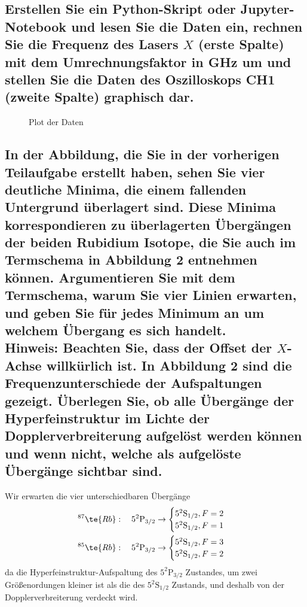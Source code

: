 \documentclass[ex,minted]{exercise_4.1}
\begin{document}
\subsection{Erstellen Sie ein Python-Skript oder Jupyter-Notebook und lesen Sie die Daten ein, rechnen Sie die
Frequenz des Lasers $X$ (erste Spalte) mit dem Umrechnungsfaktor in GHz um und stellen Sie die Daten
des Oszilloskops CH1 (zweite Spalte) graphisch dar.}

\dottedlinett


\begin{figure}[H]
    \centering
    
    \caption{Plot der Daten}
\end{figure}

\subsection{In der Abbildung, die Sie in der vorherigen Teilaufgabe erstellt haben, sehen Sie vier deutliche Minima, die
einem fallenden Untergrund überlagert sind. Diese Minima korrespondieren zu überlagerten Übergängen
der beiden Rubidium Isotope, die Sie auch im Termschema in Abbildung 2 entnehmen können. Argumentieren Sie mit dem Termschema, warum Sie vier Linien erwarten, und geben Sie für jedes Minimum an
um welchem Übergang es sich handelt.\\
Hinweis: Beachten Sie, dass der Offset der $X$-Achse willkürlich ist. In Abbildung 2 sind die Frequenzunterschiede der Aufspaltungen gezeigt. Überlegen Sie, ob alle Übergänge der Hyperfeinstruktur im Lichte der
Dopplerverbreiterung aufgelöst werden können und wenn nicht, welche als aufgelöste Übergänge sichtbar
sind.}

\dottedlinett 

Wir erwarten die vier unterschiedbaren Übergänge 
\begin{align*}
    {}^{87}\te{Rb}:\quad 
    5^2\mathrm{P}_{3/2} \to \begin{cases}
        5^2\mathrm{S}_{1/2}, F=2\\
        5^2\mathrm{S}_{1/2}, F=1\\
    \end{cases}\\
    {}^{85}\te{Rb}:\quad 
    5^2\mathrm{P}_{3/2} \to \begin{cases}
        5^2\mathrm{S}_{1/2}, F=3\\
        5^2\mathrm{S}_{1/2}, F=2\\
    \end{cases}\\
\end{align*}
da die Hyperfeinstruktur-Aufspaltung des \(5^2\mathrm{P}_{3/2}\) Zustandes, um zwei Größenordungen kleiner ist als die des \(5^2\mathrm{S}_{1/2}\) Zustands, und deshalb von der Dopplerverbreiterung verdeckt wird.\\
\end{document}
